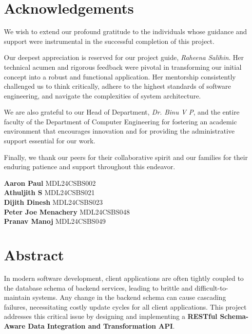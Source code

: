 \documentclass[12pt, a4paper]{report}
\begin{document}
\newpage

\chapter*{Acknowledgements}
\thispagestyle{fancy} %

We wish to extend our profound gratitude to the individuals whose guidance and support were instrumental in the successful completion of this project.

Our deepest appreciation is reserved for our project guide, \textit{Raheena Salihin}. Her technical acumen and rigorous feedback were pivotal in transforming our initial concept into a robust and functional application. Her mentorship consistently challenged us to think critically, adhere to the highest standards of software engineering, and navigate the complexities of system architecture.

We are also grateful to our Head of Department, \textit{Dr. Binu V P}, and the entire faculty of the Department of Computer Engineering for fostering an academic environment that encourages innovation and for providing the administrative support essential for our work.

Finally, we thank our peers for their collaborative spirit and our families for their enduring patience and support throughout this endeavor.

\vspace{3cm}
\begin{flushright}
    \textbf{Aaron Paul} MDL24CSBS002 \\
    \textbf{Athuljith S} MDL24CSBS021 \\
    \textbf{Dijith Dinesh} MDL24CSBS023 \\
    \textbf{Peter Joe Menachery} MDL24CSBS048 \\
    \textbf{Pranav Manoj} MDL24CSBS049
\end{flushright}

\newpage

\chapter*{Abstract}
In modern software development, client applications are often tightly coupled to the database schema of backend services, leading to brittle and difficult-to-maintain systems. Any change in the backend schema can cause cascading failures, necessitating costly update cycles for all client applications. This project addresses this critical issue by designing and implementing a \textbf{RESTful Schema-Aware Data Integration and Transformation API}.
\end{document}
